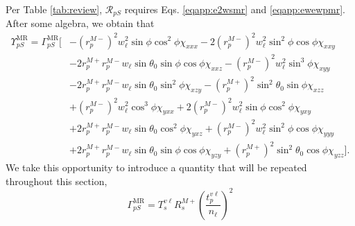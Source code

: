 Per Table \ref{tab:review}, $\mathcal{R}_{pS}$ requires Eqs. \eqref{eqapp:e2wsmr}
and \eqref{eqapp:ewewpmr}. After some algebra, we obtain that
\begin{equation}\label{eqapp:rpsfullmr}
\begin{split}
\Upsilon^{\mathrm{MR}}_{pS}
= 
\Gamma^{\mathrm{MR}}_{pS}
\big[
&- \left(r^{M-}_{p}\right)^{2}w^{2}_{\ell}\sin\phi\cos^{2}\phi\chi_{xxx}
 - 2\left(r^{M-}_{p}\right)^{2}w^{2}_{\ell}\sin^{2}\phi\cos\phi\chi_{xxy}\\
&- 2r^{M+}_{p}r^{M-}_{p}w_{\ell}\sin\theta_{0}\sin\phi\cos\phi\chi_{xxz}
 - \left(r^{M-}_{p}\right)^{2}w^{2}_{\ell}\sin^{3}\phi\chi_{xyy}\\
&- 2r^{M+}_{p}r^{M-}_{p}w_{\ell}\sin\theta_{0}\sin^{2}\phi\chi_{xzy}
 - \left(r^{M+}_{p}\right)^{2}\sin^{2}\theta_{0}\sin\phi\chi_{xzz}\\
&+ \left(r^{M-}_{p}\right)^{2}w^{2}_{\ell}\cos^{3}\phi\chi_{yxx}
 + 2\left(r^{M-}_{p}\right)^{2}w^{2}_{\ell}\sin\phi\cos^{2}\phi\chi_{yxy}\\
&+ 2r^{M+}_{p}r^{M-}_{p}w_{\ell}\sin\theta_{0}\cos^{2}\phi\chi_{yxz}
 + \left(r^{M-}_{p}\right)^{2}w^{2}_{\ell}\sin^{2}\phi\cos\phi\chi_{yyy}\\
&+ 2r^{M+}_{p}r^{M-}_{p}w_{\ell}\sin\theta_{0}\sin\phi\cos\phi\chi_{yzy}
 + \left(r^{M+}_{p}\right)^{2}\sin^{2}\theta_{0}\cos\phi\chi_{yzz}
\big].
\end{split}
\end{equation}
We take this opportunity to introduce a quantity that will be repeated
throughout this section,
\begin{equation}\label{eqapp:gammapsmr}
\Gamma^{\mathrm{MR}}_{pS} =
T_{s}^{v\ell}R^{M+}_{s}
\left(\frac{t^{v\ell}_{p}}{n_{\ell}}\right)^{2}
\end{equation}


